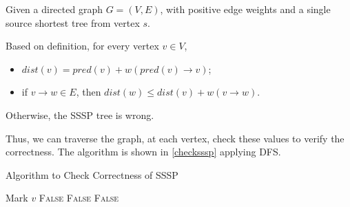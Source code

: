\documentclass[12pt,letterpaper,titlepage,en-US]{article}
\begin{document}
\begin{homeworkProblem}[SSSP]
Given a directed graph $G = (V,E)$, with positive edge weights and a single source shortest tree from vertex $s$.

Based on definition, for every vertex $v \in V$,
\begin{itemize}
    \item $dist(v) = pred(v) + w(pred(v) \rightarrow v)$;
    \item if $v \rightarrow w \in E$,
        then $dist(w) \leq dist(v) + w(v \rightarrow w)$.
\end{itemize}

Otherwise, the SSSP tree is wrong.

Thus, we can traverse the graph, at each vertex, check these values to verify the correctness.
The algorithm is shown in \cref{checksssp} applying DFS.

\begin{algorithm}[H]
    \caption{Algorithm to Check Correctness of SSSP}\label{checksssp}
    \begin{algorithmic}[1]
            \State Mark $v$
                    \Return \textsc{False}
                \EndIf
                    \Return \textsc{False}
                        \Return \textsc{False}
                    \EndIf
                \EndIf
                    \Return{}
                \EndIf
            \EndFor
        \EndProcedure
    \end{algorithmic}
\end{algorithm}

\end{homeworkProblem}
\end{document}
